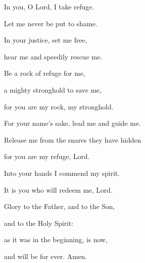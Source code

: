 \noindent In you, O Lord, I take refuge.~\GreStar{}~\nopagebreak

Let me never be put to shame.

\noindent In your justice, set me free,~\GreStar{}~\nopagebreak

hear me and speedily rescue me.

\noindent Be a rock of refuge for me,~\GreStar{}~\nopagebreak

a mighty stronghold to save me,

\noindent for you are my rock, my stronghold.~\GreStar{}~\nopagebreak

For your name’s sake, lead me and guide me.

\noindent Release me from the snares they have hidden~\GreStar{}~\nopagebreak

for you are my refuge, Lord.

\noindent Into your hands I commend my spirit.~\GreStar{}~\nopagebreak

It is you who will redeem me, Lord.

\noindent Glory to the Father, and to the Son,~\GreStar{}~\nopagebreak

and to the Holy Spirit:

\noindent as it was in the beginning, is now,~\GreStar{}~\nopagebreak

and will be for ever. Amen.

